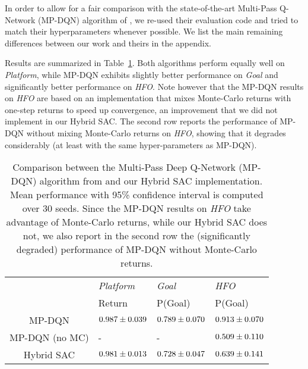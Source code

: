 \documentclass[letterpaper]{article} \usepackage{aaai20}  \usepackage{times}  \usepackage{helvet} \usepackage{courier}  \usepackage[hyphens]{url}  \usepackage{graphicx} \urlstyle{rm} \def\UrlFont{\rm}  \usepackage{graphicx}  \usepackage[section]{placeins}
\newcommand{\citet}{\cite}  \newcommand{\citep}{\cite} \DeclareMathOperator*{\softmax}{softmax}
\begin{document}
In order to allow for a fair comparison with the state-of-the-art Multi-Pass Q-Network (MP-DQN) algorithm of \citet{bester2019}, we re-used their evaluation code and tried to match their hyperparameters whenever possible. We list the main remaining differences between our work and theirs in the appendix. 

Results are summarized in Table~\ref{tab:mixed}.
Both algorithms perform equally well on {\em Platform}, while MP-DQN exhibits slightly better performance on {\em Goal} and significantly better performance on {\em HFO}.
Note however that the MP-DQN results on {\em HFO} are based on an implementation that mixes Monte-Carlo returns with one-step returns to speed up convergence, an improvement that we did not implement in our Hybrid SAC.
The second row reports the performance of MP-DQN without mixing Monte-Carlo returns on {\em HFO}, showing that it degrades considerably (at least with the same hyper-parameters as MP-DQN).


\begin{table}
\centering
\begin{tabular}{||c p{15mm} p{15mm} p{15mm}||} 
\hline
  & {\em Platform} & {\em Goal} & {\em HFO} \\ & Return & P(Goal) & P(Goal) \\
\hline\hline
MP-DQN & $0.987 \newline \pm 0.039$ & $0.789 \newline \pm 0.070$ & $0.913 \newline \pm 0.070$ \\ 
\hline
MP-DQN (no MC) & - & - & $0.509 \newline \pm 0.110$ \\
\hline
Hybrid SAC & $0.981 \newline \pm 0.013$ & $0.728 \newline \pm 0.047$ & $0.639 \newline \pm 0.141$ \\
\hline
\end{tabular}
\caption{Comparison between the Multi-Pass Deep Q-Network (MP-DQN) algorithm from \citet{bester2019} and our Hybrid SAC implementation.
Mean performance with 95\% confidence interval is computed over 30 seeds.
Since the MP-DQN results on {\em HFO} take advantage of Monte-Carlo returns, while our Hybrid SAC does not, we also report in the second row the (significantly degraded) performance of MP-DQN without Monte-Carlo returns.
}
\label{tab:mixed}
\end{table}
\end{document}
